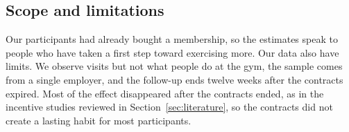 \subsection{Scope and limitations}
Our participants had already bought a membership, so the estimates speak to people who have taken a first step toward exercising more. Our data also have limits. We observe visits but not what people do at the gym, the sample comes from a single employer, and the follow-up ends twelve weeks after the contracts expired. Most of the effect disappeared after the contracts ended, as in the incentive studies reviewed in Section~\ref{sec:literature}, so the contracts did not create a lasting habit for most participants.
